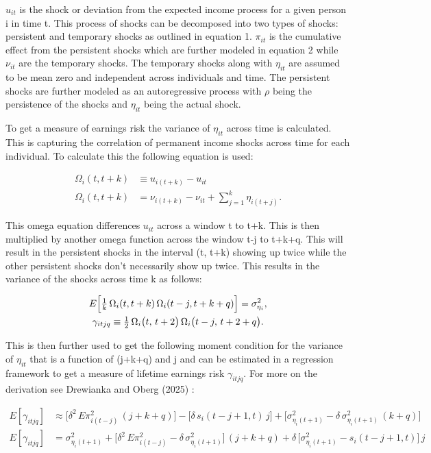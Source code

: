 \documentclass[12pt]{article}
\begin{document}
\begin{onehalfspace}
$u_{it}$ is the shock or deviation from the expected income process for a given person i in time t. This process of shocks can be decomposed into two types of shocks: persistent and temporary shocks as outlined in equation 1. $\pi_{it}$ is the cumulative effect from the persistent shocks which are further modeled in equation 2 while $\nu_{it}$ are the temporary shocks. The temporary shocks along with $\eta_{it}$ are assumed to be mean zero and independent across individuals and time. The persistent shocks are further modeled as an autoregressive process with $\rho$ being the persistence of the shocks and $\eta_{it}$ being the actual shock.

To get a measure of earnings risk the variance of $\eta_{it}$ across time is calculated. This is capturing the correlation of permanent income shocks across time for each individual. To calculate this the following equation is used:

\begin{align}
\Omega_i(t,t+k)
&\equiv u_{i(t+k)} - u_{it}\\[1ex]
\Omega_i(t,t+k)
&= \nu_{i(t+k)} - \nu_{it}
  + \sum_{j=1}^k \eta_{i(t+j)}.
\end{align}

This omega equation differences $u_{it}$ across a window t to t+k. This is then multiplied by another omega function across the window t-j to t+k+q. This will result in the persistent shocks in the interval (t, t+k) showing up twice while the other persistent shocks don't necessarily show up twice. This results in the variance of the shocks across time k as follows:

\begin{gather}
E\Bigl[\tfrac{1}{k}\,\Omega_i(t,t+k)\,\Omega_i(t-j,t+k+q)\Bigr]
= \sigma^2_{\eta_i},\\
\gamma_{itjq}
\equiv \tfrac12\,\Omega_i\bigl(t,\,t+2\bigr)\,\Omega_i\bigl(t - j,\,t + 2 + q\bigr).
\end{gather}

This is then further used to get the following moment condition for the variance of $\eta_{it}$ that is a function of (j+k+q) and j and can be estimated in a regression framework to get a measure of lifetime earnings risk $\gamma_{itjq}$. For more on the derivation see Drewianka and Oberg (2025) \cite{drewianka2025}:

\begin{align}
E[\gamma_{itjq}]
&\approx
\bigl[\delta^2\,E\pi^2_{i(t-j)}\,(j+k+q)\bigr]
- \bigl[\delta\,s_i(t-j+1,t)\,j\bigr]
+ \bigl[\sigma^2_{\eta_i(t+1)}
  - \delta\,\sigma^2_{\eta_i(t+1)}\,(k+q)\bigr] \\[1ex]
E[\gamma_{itjq}]
&=
\sigma^2_{\eta_i(t+1)}
+ \bigl[\delta^2\,E\pi^2_{i(t-j)} - \delta\,\sigma^2_{\eta_i(t+1)}\bigr]\,(j+k+q)
+ \delta\,\bigl[\sigma^2_{\eta_i(t+1)} - s_i(t-j+1,t)\bigr]\,j
\end{align}


\end{onehalfspace}
\end{document}
